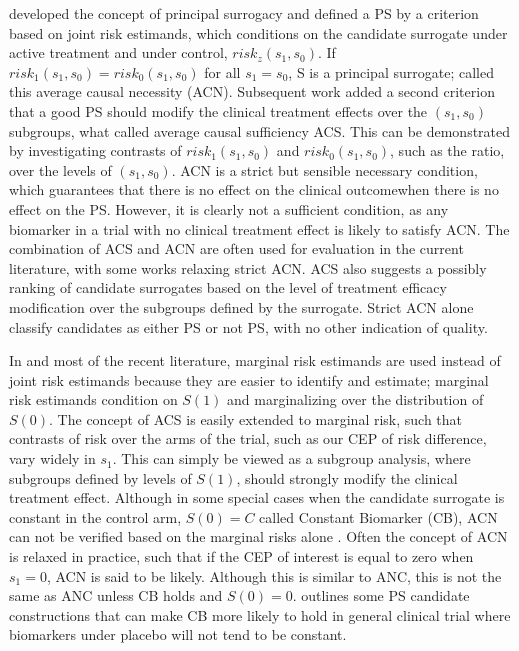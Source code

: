 \documentclass[times, doublespace]{simauth}
\begin{document}
\citet{Frangakis02} developed the concept of principal surrogacy and defined a PS by a criterion based on joint risk estimands, which conditions on the candidate surrogate under active treatment and under control, $risk_z(s_1,s_0)$. If $risk_1(s_1,s_0)=risk_0(s_1,s_0)$ for all $s_1 = s_0$, S is a principal surrogate; \citet{Gilbert08} called this average causal necessity (ACN). Subsequent work added a second criterion that a good PS should modify the clinical treatment effects over the $(s_1, s_0)$ subgroups, what \citet{Gilbert08} called average causal sufficiency ACS. This can be demonstrated by investigating contrasts of $risk_1(s_1,s_0)$ and $risk_0(s_1,s_0)$, such as the ratio, over the levels of $(s_1, s_0)$.  ACN is a strict but sensible necessary condition, which guarantees that there is no effect on the clinical outcomewhen there is no effect on the PS. However, it is clearly not a sufficient condition, as any biomarker in a trial with no clinical treatment effect is likely to satisfy ACN.  The combination of ACS and ACN are often used for evaluation in the current literature, with some works relaxing strict ACN.  ACS also suggests a possibly ranking of candidate surrogates based on the level of treatment efficacy modification over the subgroups defined by the surrogate. Strict ACN alone classify candidates as either PS or not PS, with no other indication of quality.  

In \citet{Gilbert08}  and most of the recent literature, marginal risk estimands are used instead of joint risk estimands because they are easier to identify and estimate; marginal risk estimands condition on $S(1)$ and marginalizing over the distribution of $S(0)$. The concept of ACS is easily extended to marginal risk, such that contrasts of risk over the arms of the trial, such as our CEP of risk difference, vary widely in $s_1$. This can simply be viewed as a subgroup analysis, where subgroups defined by levels of $S(1)$, should strongly modify the clinical treatment effect. Although in some special cases when the candidate surrogate is constant in the control arm, $S(0)=C$ called Constant Biomarker (CB), ACN can not be verified based on the marginal risks alone \citep{Gilbert08, Gabriel13}.  Often the concept of ACN is relaxed in practice, such that if the CEP of interest is equal to zero when $s_1=0$, ACN is said to be likely. Although this is similar to ANC, this is not the same as ANC unless CB holds and $S(0)=0$. \citet{Gabriel13} outlines some PS candidate constructions that can make CB more likely to hold in general clinical trial where biomarkers under placebo will not tend to be constant. 
  
\end{document}
